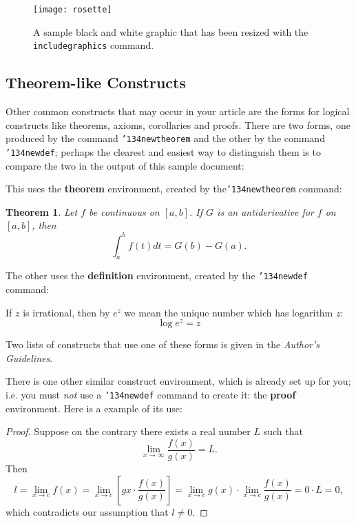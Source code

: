 \documentclass{sig-alternate-05-2015}
\begin{document}
\begin{figure}
\centering
\texttt{[image: rosette]}
\caption{A sample black and white graphic that has
been resized with the \texttt{includegraphics} command.}
\vskip -6pt
\end{figure}

\subsection{Theorem-like Constructs}
Other common constructs that may occur in your article are
the forms for logical constructs like theorems, axioms,
corollaries and proofs.  There are
two forms, one produced by the
command \texttt{{\char'134}newtheorem} and the
other by the command \texttt{{\char'134}newdef}; perhaps
the clearest and easiest way to distinguish them is
to compare the two in the output of this sample document:

This uses the \textbf{theorem} environment, created by
the\linebreak\texttt{{\char'134}newtheorem} command:
\newtheorem{theorem}{Theorem}
\begin{theorem}
Let $f$ be continuous on $[a,b]$.  If $G$ is
an antiderivative for $f$ on $[a,b]$, then
\begin{displaymath}\int^b_af(t)dt = G(b) - G(a).\end{displaymath}
\end{theorem}

The other uses the \textbf{definition} environment, created
by the \texttt{{\char'134}newdef} command:
\begin{definition}
If $z$ is irrational, then by $e^z$ we mean the
unique number which has
logarithm $z$: \begin{displaymath}{\log e^z = z}\end{displaymath}
\end{definition}

Two lists of constructs that use one of these
forms is given in the
\textit{Author's  Guidelines}.
 
There is one other similar construct environment, which is
already set up
for you; i.e. you must \textit{not} use
a \texttt{{\char'134}newdef} command to
create it: the \textbf{proof} environment.  Here
is a example of its use:
\begin{proof}
Suppose on the contrary there exists a real number $L$ such that
\begin{displaymath}
\lim_{x\rightarrow\infty} \frac{f(x)}{g(x)} = L.
\end{displaymath}
Then
\begin{displaymath}
l=\lim_{x\rightarrow c} f(x)
= \lim_{x\rightarrow c}
\left[ g{x} \cdot \frac{f(x)}{g(x)} \right ]
= \lim_{x\rightarrow c} g(x) \cdot \lim_{x\rightarrow c}
\frac{f(x)}{g(x)} = 0\cdot L = 0,
\end{displaymath}
which contradicts our assumption that $l\neq 0$.
\end{proof}
\end{document}

